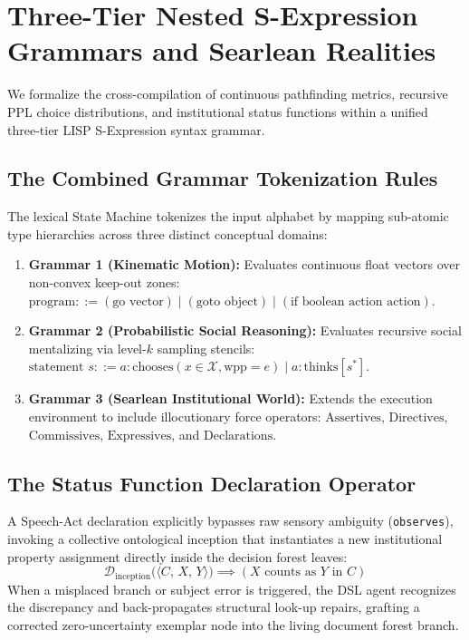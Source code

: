 \documentclass[11pt,fleqn]{article}
\begin{document}
\section{Three-Tier Nested S-Expression Grammars and Searlean Realities}
We formalize the cross-compilation of continuous pathfinding metrics, recursive PPL choice distributions, and institutional status functions within a unified three-tier LISP S-Expression syntax grammar.

\subsection{The Combined Grammar Tokenization Rules}
The lexical State Machine tokenizes the input alphabet by mapping sub-atomic type hierarchies across three distinct conceptual domains:
\begin{enumerate}
    \item \textbf{Grammar 1 (Kinematic Motion):} Evaluates continuous float vectors over non-convex keep-out zones: $\text{program} ::= (\text{go } \text{vector}) \mid (\text{goto } \text{object}) \mid (\text{if } \text{boolean } \text{action } \text{action})$.
    \item \textbf{Grammar 2 (Probabilistic Social Reasoning):} Evaluates recursive social mentalizing via level-$k$ sampling stencils: $\text{statement } s ::= a : \text{chooses}(x \in \mathcal{X}, \text{wpp}=e) \mid a : \text{thinks}[s^*]$.
    \item \textbf{Grammar 3 (Searlean Institutional World):} Extends the execution environment to include illocutionary force operators: $\text{Assertives}$, $\text{Directives}$, $\text{Commissives}$, $\text{Expressives}$, and $\text{Declarations}$.
\end{enumerate}

\subsection{The Status Function Declaration Operator}
A Speech-Act declaration explicitly bypasses raw sensory ambiguity (\texttt{observes}), invoking a collective ontological inception that instantiates a new institutional property assignment directly inside the decision forest leaves:
\begin{equation}
\mathcal{D}_{\text{inception}}\Big( \langle C, \, X, \, Y \rangle \Big) \implies \left( X \text{ counts as } Y \text{ in } C \right)
\end{equation}
When a misplaced branch or subject error is triggered, the DSL agent recognizes the discrepancy and back-propagates structural look-up repairs, grafting a corrected zero-uncertainty exemplar node into the living document forest branch.
\end{document}
